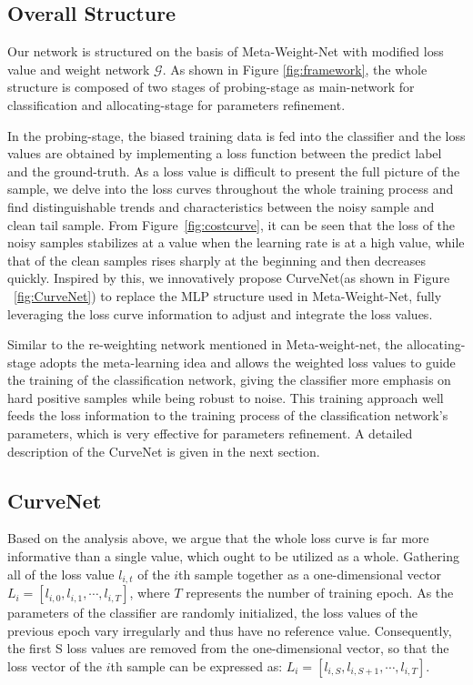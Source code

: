 \documentclass[letterpaper]{article} %
\begin{document}
\subsection{Overall Structure} \label{sec:os}
Our network is structured on the basis of Meta-Weight-Net\cite{shu2019meta} with modified loss value and weight network $\mathcal{G}$. As shown in Figure \ref{fig:framework}, the whole structure is composed of two stages of probing-stage as main-network for classification and allocating-stage for parameters refinement.

In the probing-stage, the biased training data is fed into the classifier and the loss values are obtained by implementing a loss function between the predict label and the ground-truth.
As a loss value is difficult to present the full picture of the sample, we delve into the loss curves throughout the whole training process and find distinguishable trends and characteristics between the noisy sample and clean tail sample.
From Figure~\ref{fig:costcurve}, it can be seen that the loss of the noisy samples stabilizes at a value when the learning rate is at a high value, while that of the clean samples rises sharply at the beginning and then decreases quickly.
Inspired by this, we innovatively propose CurveNet(as shown in Figure ~\ref{fig:CurveNet}) to replace the MLP structure used in Meta-Weight-Net\cite{shu2019meta}, fully leveraging the loss curve information to adjust and integrate the loss values.

Similar to the re-weighting network mentioned in Meta-weight-net, the allocating-stage adopts the meta-learning idea and allows the weighted loss values to guide the training of the classification network, giving the classifier more emphasis on hard positive samples while being robust to noise.
This training approach well feeds the loss information to the training process of the classification network's parameters, which is very effective for parameters refinement.
A detailed description of the CurveNet is given in the next section.

\subsection{CurveNet}


Based on the analysis above, we argue that the whole loss curve is far more informative than a single value, which ought to be utilized as a whole.
Gathering all of the loss value $l_{i,t}$ of the $i$th sample together as a one-dimensional vector $L_i=[l_{i,0}, l_{i,1}, \cdots, l_{i,T}]$, where $T$ represents the number of training epoch.
As the parameters of the classifier are randomly initialized, the loss values of the previous epoch vary irregularly and thus have no reference value.
Consequently, the first S loss values are removed from the one-dimensional vector, so that the loss vector of the $i$th sample can be expressed as: $L_i=[l_{i,S}, l_{i,S+1}, \cdots, l_{i,T}]$.
\end{document}

